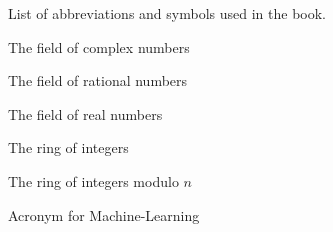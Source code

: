 %
%


List of abbreviations and symbols used in the book.

\begin{description}[CABR]
\item[$\mathbb{C}$]{The field of complex numbers}
\item[$\mathbb{Q}$]{The field of rational numbers} 
\item[$\mathbb{R}$]{The field of real numbers}
\item[$\mathbb{Z}$]{The ring of integers}
\item[$\mathbb{Z}/n\mathbb{Z}$]{The ring of integers modulo $n$}
\item[ML]{Acronym for Machine-Learning}
\end{description}